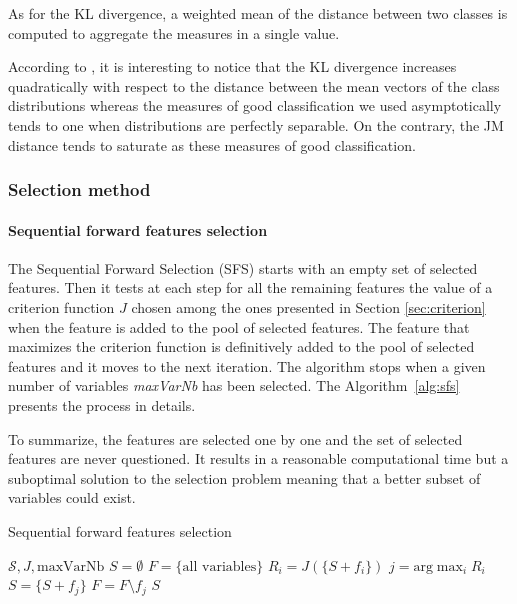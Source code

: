 \documentclass[a4paper,11pt,DIV=16,abstracton]{scrartcl}
\begin{document}
            As for the KL divergence, a weighted mean of the distance between two classes is computed to aggregate the measures in a single value.

            \vspace{10 mm}

            According to \cite{bruzzone2009novel}, it is interesting to notice that the KL divergence increases quadratically with respect to the distance between the mean vectors of the class distributions whereas the measures of good classification we used asymptotically tends to one when distributions are perfectly separable. On the contrary, the JM distance tends to saturate as these measures of good classification.


        \subsubsection{Selection method}

            \paragraph{Sequential forward features selection}
            \label{sec:forward-presentation}

            The Sequential Forward Selection (SFS) starts with an empty set of selected features. Then it tests at each step for all the remaining features the value of a criterion function $J$ chosen among the ones presented in Section \ref{sec:criterion} when the feature is added to the pool of selected features. The feature that maximizes the criterion function is definitively added to the pool of selected features and it moves to the next iteration. The algorithm stops when a given number of variables \emph{maxVarNb} has been selected. The Algorithm~\ref{alg:sfs} presents the process in details.

            To summarize, the features are selected one by one and the set of selected features are never questioned. It results in a reasonable computational time but a suboptimal solution to the selection problem meaning that a better subset of variables could exist.

            \begin{algorithm}
            \caption{Sequential forward features selection\label{alg:sfs}}
            {\fontsize{10}{10}\selectfont
            \begin{algorithmic}[1]
            \REQUIRE $\mathcal{S},J,\text{maxVarNb}$
            \STATE $S=\emptyset$
            \STATE $F=\text{\{all variables\}}$
            \STATE $R_i = J(\{S + f_i\})$
            \ENDFOR
            \STATE $j=\text{arg} \max_{i} R_i$
            \STATE $S = \{S + f_j\}$
            \STATE $F = F \setminus f_j$
            \ENDWHILE
            \RETURN $S$
            \end{algorithmic}
            }
            \end{algorithm}
\end{document}
